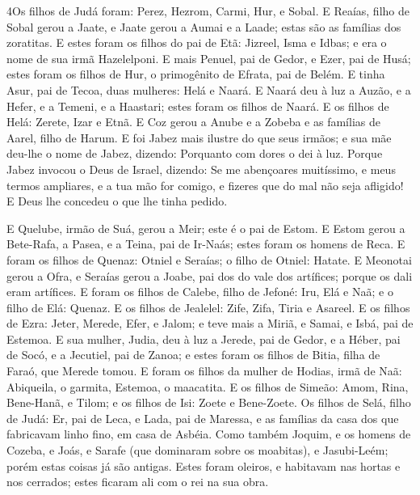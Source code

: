 \lettrine{4} Os filhos de Judá foram: Perez, Hezrom, Carmi,
Hur, e Sobal. E Reaías, filho de Sobal gerou a Jaate, e Jaate
gerou a Aumai e a Laade; estas são as famílias dos zoratitas. E
estes foram os filhos do pai de Etã: Jizreel, Isma e Idbas; e era o
nome de sua irmã Hazelelponi. E mais Penuel, pai de Gedor, e
Ezer, pai de Husá; estes foram os filhos de Hur, o primogênito de
Efrata, pai de Belém. E tinha Asur, pai de Tecoa, duas mulheres:
Helá e Naará. E Naará deu à luz a Auzão, e a Hefer, e a Temeni,
e a Haastari; estes foram os filhos de Naará. E os filhos de
Helá: Zerete, Izar e Etnã. E Coz gerou a Anube e a Zobeba e as
famílias de Aarel, filho de Harum. E foi Jabez mais ilustre do
que seus irmãos; e sua mãe deu-lhe o nome de Jabez, dizendo:
Porquanto com dores o dei à luz. Porque Jabez invocou o Deus
de Israel, dizendo: Se me abençoares muitíssimo, e meus termos
ampliares, e a tua mão for comigo, e fizeres que do mal não seja
afligido! E Deus lhe concedeu o que lhe tinha pedido.

E Quelube, irmão de Suá, gerou a Meir; este é o pai de Estom.
E Estom gerou a Bete-Rafa, a Pasea, e a Teina, pai de
Ir-Naás; estes foram os homens de Reca. E foram os filhos de
Quenaz: Otniel e Seraías; o filho de Otniel: Hatate. E
Meonotai gerou a Ofra, e Seraías gerou a Joabe, pai dos do vale dos
artífices; porque os dali eram artífices. E foram os filhos
de Calebe, filho de Jefoné: Iru, Elá e Naã; e o filho de Elá:
Quenaz. E os filhos de Jealelel: Zife, Zifa, Tiria e Asareel.
E os filhos de Ezra: Jeter, Merede, Efer, e Jalom; e teve
mais a Miriã, e Samai, e Isbá, pai de Estemoa. E sua mulher,
Judia, deu à luz a Jerede, pai de Gedor, e a Héber, pai de Socó, e a
Jecutiel, pai de Zanoa; e estes foram os filhos de Bitia, filha de
Faraó, que Merede tomou. E foram os filhos da mulher de
Hodias, irmã de Naã: Abiqueila, o garmita, Estemoa, o maacatita.
E os filhos de Simeão: Amom, Rina, Bene-Hanã, e Tilom; e os
filhos de Isi: Zoete e Bene-Zoete. Os filhos de Selá, filho
de Judá: Er, pai de Leca, e Lada, pai de Maressa, e as famílias da
casa dos que fabricavam linho fino, em casa de Asbéia. Como
também Joquim, e os homens de Cozeba, e Joás, e Sarafe (que
dominaram sobre os moabitas), e Jasubi-Leém; porém estas coisas já
são antigas. Estes foram oleiros, e habitavam nas hortas e
nos cerrados; estes ficaram ali com o rei na sua obra.

